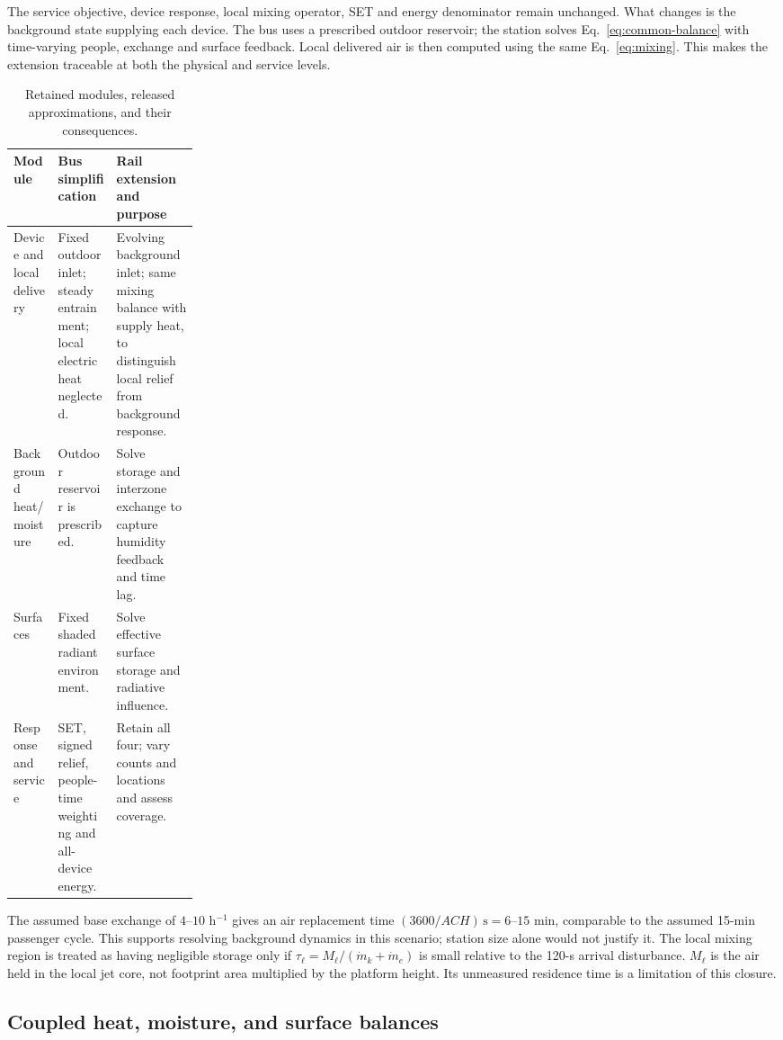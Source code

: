 The service objective, device response, local mixing operator, SET and energy denominator remain unchanged. What changes is the background state supplying each device. The bus uses a prescribed outdoor reservoir; the station solves Eq.~\eqref{eq:common-balance} with time-varying people, exchange and surface feedback. Local delivered air is then computed using the same Eq.~\eqref{eq:mixing}. This makes the extension traceable at both the physical and service levels.

\begin{table}[!ht]
\centering\small
\caption{Retained modules, released approximations, and their consequences.}
\label{tab:rail-changes}
\begin{tabularx}{\linewidth}{@{}>{\raggedright\arraybackslash}p{0.24\linewidth}XX@{}}
\toprule
Module & Bus simplification & Rail extension and purpose\\
\midrule
Device and local delivery & Fixed outdoor inlet; steady entrainment; local electric heat neglected. & Evolving background inlet; same mixing balance with supply heat, to distinguish local relief from background response.\\
Background heat/moisture & Outdoor reservoir is prescribed. & Solve storage and interzone exchange to capture humidity feedback and time lag.\\
Surfaces & Fixed shaded radiant environment. & Solve effective surface storage and radiative influence.\\
Response and service & SET, signed relief, people-time weighting and all-device energy. & Retain all four; vary counts and locations and assess coverage.\\
\bottomrule
\end{tabularx}
\end{table}

The assumed base exchange of $4$--$10$ h$^{-1}$ gives an air replacement time $(3600/ACH)\,\mathrm{s}=6$--$15$ min, comparable to the assumed 15-min passenger cycle. This supports resolving background dynamics in this scenario; station size alone would not justify it. The local mixing region is treated as having negligible storage only if $\tau_\ell=M_\ell/(\dot m_k+\dot m_e)$ is small relative to the 120-s arrival disturbance. $M_\ell$ is the air held in the local jet core, not footprint area multiplied by the platform height. Its unmeasured residence time is a limitation of this closure.

\subsection{Coupled heat, moisture, and surface balances}

